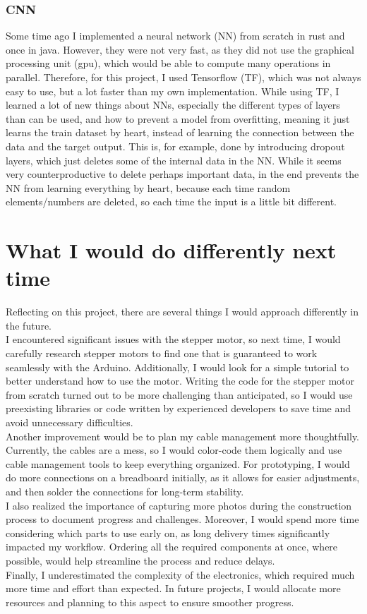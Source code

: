 \subsubsection{CNN}
Some time ago I implemented a neural network (NN) from scratch in rust and once in java.
However, they were not very fast, as they did not use the graphical processing unit (gpu), which would be able to compute many operations in parallel.
Therefore, for this project, I used Tensorflow (TF), which was not always easy to use, but a lot faster than my own implementation.
While using TF, I learned a lot of new things about NNs, especially the different types of layers than can be used, and how to prevent a model from overfitting, meaning it just learns the train dataset by heart, instead of learning the connection between the data and the target output.
This is, for example, done by introducing dropout layers, which just deletes some of the internal data in the NN.
While it seems very counterproductive to delete perhaps important data, in the end prevents the NN from learning everything by heart, because each time random elements/numbers are deleted, so each time the input is a little bit different.


\section{What I would do differently next time}\label{sec:different}
Reflecting on this project, there are several things I would approach differently in the future.\\
I encountered significant issues with the stepper motor, so next time, I would carefully research stepper motors to find one that is guaranteed to work seamlessly with the Arduino.
Additionally, I would look for a simple tutorial to better understand how to use the motor.
Writing the code for the stepper motor from scratch turned out to be more challenging than anticipated, so I would use preexisting libraries or code written by experienced developers to save time and avoid unnecessary difficulties.\\
Another improvement would be to plan my cable management more thoughtfully.
Currently, the cables are a mess, so I would color-code them logically and use cable management tools to keep everything organized.
For prototyping, I would do more connections on a breadboard initially, as it allows for easier adjustments, and then solder the connections for long-term stability.\\
I also realized the importance of capturing more photos during the construction process to document progress and challenges.
Moreover, I would spend more time considering which parts to use early on, as long delivery times significantly impacted my workflow.
Ordering all the required components at once, where possible, would help streamline the process and reduce delays.\\
Finally, I underestimated the complexity of the electronics, which required much more time and effort than expected.
In future projects, I would allocate more resources and planning to this aspect to ensure smoother progress.


